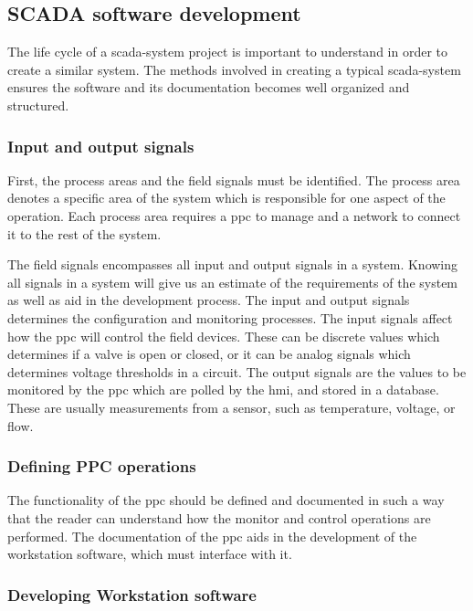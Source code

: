 \documentclass[main.tex]{subfiles}
\begin{document}
\subsection{SCADA software development}

The life cycle of a \gls{scada}-system project is important to understand in order to create a similar system. The methods involved in creating a typical \gls{scada}-system ensures the software and its documentation becomes well organized and structured.


\subsubsection{Input and output signals}

 First, the process areas and the field signals must be identified. The process area denotes a specific area of the system which is responsible for one aspect of the operation. Each process area requires a \gls{ppc} to manage and a network to connect it to the rest of the system.

The field signals encompasses all input and output signals in a system. Knowing all signals in a system will give us an estimate of the requirements of the system as well as aid in the development process. The input and output signals determines the configuration and monitoring processes. The input signals affect how the \gls{ppc} will control the field devices. These can be discrete values which determines if a valve is open or closed, or it can be analog signals which determines voltage thresholds in a circuit. The output signals are the values to be monitored by the \gls{ppc} which are polled by the \gls{hmi}, and stored in a database. These are usually measurements from a sensor, such as temperature, voltage, or flow.


\subsubsection{Defining PPC operations}

The functionality of the \gls{ppc} should be defined and documented in such a way that the reader can understand how the monitor and control operations are performed. The documentation of the \gls{ppc} aids in the development of the workstation software, which must interface with it.

\subsubsection{Developing Workstation software}
\end{document}
